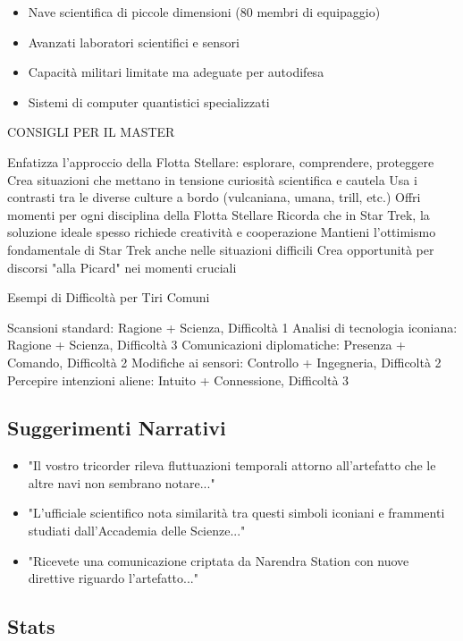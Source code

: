 \documentclass[letterpaper,twocolumn,openany,nodeprecatedcode]{dndbook}
\begin{document}
\begin{itemize}
    \item Nave scientifica di piccole dimensioni (80 membri di equipaggio)
    \item Avanzati laboratori scientifici e sensori
    \item Capacità militari limitate ma adeguate per autodifesa
    \item Sistemi di computer quantistici specializzati
\end{itemize}

CONSIGLI PER IL MASTER

Enfatizza l'approccio della Flotta Stellare: esplorare, comprendere, proteggere
Crea situazioni che mettano in tensione curiosità scientifica e cautela
Usa i contrasti tra le diverse culture a bordo (vulcaniana, umana, trill, etc.)
Offri momenti per ogni disciplina della Flotta Stellare
Ricorda che in Star Trek, la soluzione ideale spesso richiede creatività e cooperazione
Mantieni l'ottimismo fondamentale di Star Trek anche nelle situazioni difficili
Crea opportunità per discorsi "alla Picard" nei momenti cruciali

Esempi di Difficoltà per Tiri Comuni

Scansioni standard: Ragione + Scienza, Difficoltà 1
Analisi di tecnologia iconiana: Ragione + Scienza, Difficoltà 3
Comunicazioni diplomatiche: Presenza + Comando, Difficoltà 2
Modifiche ai sensori: Controllo + Ingegneria, Difficoltà 2
Percepire intenzioni aliene: Intuito + Connessione, Difficoltà 3


\subsection{Suggerimenti Narrativi}

\begin{itemize}
    \item "Il vostro tricorder rileva fluttuazioni temporali attorno all'artefatto che le altre navi non sembrano notare..."
    \item "L'ufficiale scientifico nota similarità tra questi simboli iconiani e frammenti studiati dall'Accademia delle Scienze..."
    \item "Ricevete una comunicazione criptata da Narendra Station con nuove direttive riguardo l'artefatto..."
\end{itemize}


\subsection {Stats}
\end{document}

